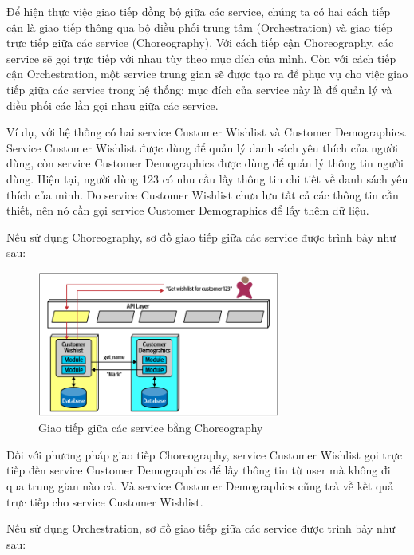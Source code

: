 \hspace*{0.5cm} Để hiện thực việc giao tiếp đồng bộ giữa các service, chúng ta có hai cách tiếp cận là giao tiếp thông qua bộ điều phối trung tâm (Orchestration) và giao tiếp trực tiếp giữa các service (Choreography). Với cách tiếp cận Choreography, các service sẽ gọi trực tiếp với nhau tùy theo mục đích của mình. Còn với cách tiếp cận Orchestration, một service trung gian sẽ được tạo ra để phục vụ cho việc giao tiếp giữa các service trong hệ thống; mục đích của service này là để quản lý và điều phối các lần gọi nhau giữa các service. 
\par Ví dụ, với hệ thống có hai service Customer Wishlist và Customer Demographics. Service Customer Wishlist được dùng để quản lý danh sách yêu thích của người dùng, còn service Customer Demographics được dùng để quản lý thông tin người dùng. Hiện tại, người dùng 123 có nhu cầu lấy thông tin chi tiết về danh sách yêu thích của mình. Do service Customer Wishlist chưa lưu tất cả các thông tin cần thiết, nên nó cần gọi service Customer Demographics để lấy thêm dữ liệu.

\par Nếu sử dụng Choreography, sơ đồ giao tiếp giữa các service được trình bày như sau:
\begin{figure}[!htp]
	\centering
	\includegraphics[width=8cm]{img/Architecture/choreography.PNG}
	\newline
	\caption{Giao tiếp giữa các service bằng Choreography \cite{archChoreography}}
\end{figure}

Đối với phương pháp giao tiếp Choreography, service Customer Wishlist gọi trực tiếp đến service Customer Demographics để lấy thông tin từ user mà không đi qua trung gian nào cả. Và service Customer Demographics cũng trả về kết quả trực tiếp cho service Customer Wishlist.

\par Nếu sử dụng Orchestration, sơ đồ giao tiếp giữa các service được trình bày như sau:

